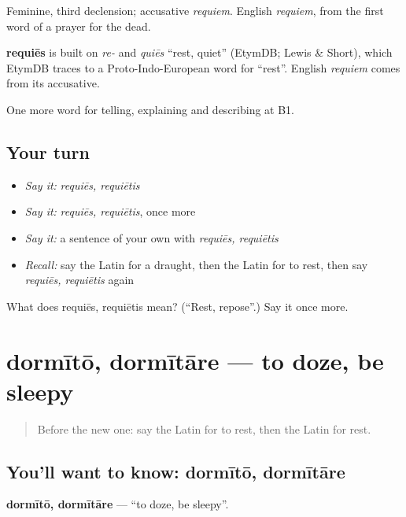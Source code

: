 Feminine, third declension; accusative \emph{requiem}. English \emph{requiem}, from the first word of a prayer for the dead.

\begin{cousinweb}
\textbf{requiēs} is built on \emph{re-} and \emph{quiēs} \textquotedblleft{}rest, quiet\textquotedblright{} (EtymDB; Lewis \& Short), which EtymDB traces to a Proto-Indo-European word for \textquotedblleft{}rest\textquotedblright{}. English \emph{requiem} comes from its accusative.
\end{cousinweb}

\begin{grammarlens}[title={What you've built}]
One more word for telling, explaining and describing at B1.
\end{grammarlens}

\subsection*{Your turn}
\begin{itemize}
\raggedright
  \item \emph{Say it:} \emph{requiēs, requiētis}
  \item \emph{Say it:} \emph{requiēs, requiētis}, once more
  \item \emph{Say it:} a sentence of your own with \emph{requiēs, requiētis}
  \item \emph{Recall:} say the Latin for a draught, then the Latin for to rest, then say \emph{requiēs, requiētis} again
\end{itemize}

\begin{tcolorbox}[breakable,colback=teal!4,colframe=teal!35!black,title={Before you move on}]
What does requiēs, requiētis mean? (\textquotedblleft{}Rest, repose\textquotedblright{}.) Say it once more.
\end{tcolorbox}
\section[dormītō, dormītāre]{dormītō, dormītāre — to doze, be sleepy}

\label{lesson:LA-C527-dormito}



\begin{quote}
Before the new one: say the Latin for to rest, then the Latin for rest.
\end{quote}

\subsection*{You'll want to know: dormītō, dormītāre}
\textbf{dormītō, dormītāre} — \textquotedblleft{}to doze, be sleepy\textquotedblright{}.

